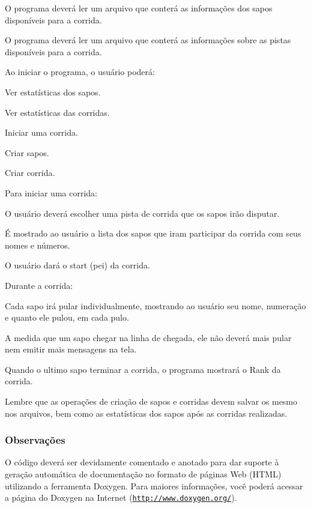 \begin{DoxyItemize}
\item O programa deverá ler um arquivo que conterá as informações dos sapos disponíveis para a corrida.
\item O programa deverá ler um arquivo que conterá as informações sobre as pistas disponíveis para a corrida.
\item Ao iniciar o programa, o usuário poderá\+:
\begin{DoxyItemize}
\item Ver estatísticas dos sapos.
\item Ver estatísticas das corridas.
\item Iniciar uma corrida.
\item Criar sapos.
\item Criar corrida.
\end{DoxyItemize}
\item Para iniciar uma corrida\+:
\begin{DoxyItemize}
\item O usuário deverá escolher uma pista de corrida que os sapos irão disputar.
\item É mostrado ao usuário a lista dos sapos que iram participar da corrida com seus nomes e números.
\item O usuário dará o start (pei) da corrida.
\end{DoxyItemize}
\item Durante a corrida\+:
\begin{DoxyItemize}
\item Cada sapo irá pular individualmente, mostrando ao usuário seu nome, numeração e quanto ele pulou, em cada pulo.
\item A medida que um sapo chegar na linha de chegada, ele não deverá mais pular nem emitir mais mensagens na tela.
\item Quando o ultimo sapo terminar a corrida, o programa mostrará o Rank da corrida.
\end{DoxyItemize}
\item Lembre que as operações de criação de sapos e corridas devem salvar os mesmo nos arquivos, bem como as estatísticas dos sapos após as corridas realizadas.
\end{DoxyItemize}

\subsubsection*{Observações}

O código deverá ser devidamente comentado e anotado para dar suporte à geração automática de documentação no formato de páginas Web (H\+T\+ML) utilizando a ferramenta Doxygen. Para maiores informações, você poderá acessar a página do Doxygen na Internet (\href{http://www.doxygen.org/}{\tt http\+://www.\+doxygen.\+org/}).

